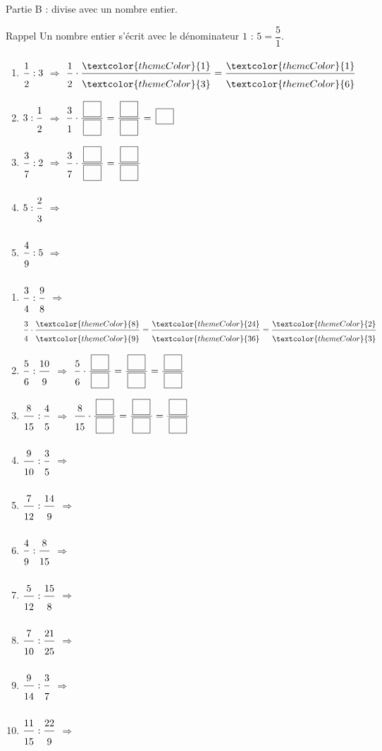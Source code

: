 \bigskip
\textcolor{themeColor}{Partie B} : divise avec un nombre entier.

\begin{astuce}{Rappel}
Un nombre entier s'écrit avec le dénominateur $1$ : $5=\dfrac{5}{1}$.
\end{astuce}

\begin{enumerate}[leftmargin=*,align=parleft, label=\alph*), itemsep=9pt, start=6]
\item $\FA{1}{2}:3$ \quad $\Longrightarrow$ \quad $\FA{1}{2}\cdot\FA{\textcolor{themeColor}{1}}{\textcolor{themeColor}{3}}=\FA{\textcolor{themeColor}{1}}{\textcolor{themeColor}{6}}$
\item $3:\FA{1}{2}$ \quad $\Longrightarrow$ \quad $\FA{3}{1}\cdot\FA{\CaseC}{\CaseC}=\FA{\CaseC}{\CaseC}=\CaseC$
\item $\FA{3}{7}:2$ \quad $\Longrightarrow$ \quad $\FA{3}{7}\cdot\FA{\CaseC}{\CaseC}=\FA{\CaseC}{\CaseC}$
\item $5:\FA{2}{3}$ \quad $\Longrightarrow$
\item $\FA{4}{9}:5$ \quad $\Longrightarrow$
\end{enumerate}

\newpage
{}

\begin{enumerate}[leftmargin=*,align=parleft, label=\alph*), itemsep=9pt]
\item $\FA{3}{4}:\FA{9}{8}$ \quad $\Longrightarrow$ \quad $\FA{3}{4}\cdot\FA{\textcolor{themeColor}{8}}{\textcolor{themeColor}{9}}=\FA{\textcolor{themeColor}{24}}{\textcolor{themeColor}{36}}=\FA{\textcolor{themeColor}{2}}{\textcolor{themeColor}{3}}$
\item $\FA{5}{6}:\FA{10}{9}$ \quad $\Longrightarrow$ \quad $\FA{5}{6}\cdot\FA{\CaseC}{\CaseC}=\FA{\CaseC}{\CaseC}=\FA{\CaseC}{\CaseC}$
\item $\FA{8}{15}:\FA{4}{5}$ \quad $\Longrightarrow$ \quad $\FA{8}{15}\cdot\FA{\CaseC}{\CaseC}=\FA{\CaseC}{\CaseC}=\FA{\CaseC}{\CaseC}$
\item $\FA{9}{10}:\FA{3}{5}$ \quad $\Longrightarrow$
\item $\FA{7}{12}:\FA{14}{9}$ \quad $\Longrightarrow$
\item $\FA{4}{9}:\FA{8}{15}$ \quad $\Longrightarrow$
\item $\FA{5}{12}:\FA{15}{8}$ \quad $\Longrightarrow$
\item $\FA{7}{10}:\FA{21}{25}$ \quad $\Longrightarrow$
\item $\FA{9}{14}:\FA{3}{7}$ \quad $\Longrightarrow$
\item $\FA{11}{15}:\FA{22}{9}$ \quad $\Longrightarrow$
\end{enumerate}

